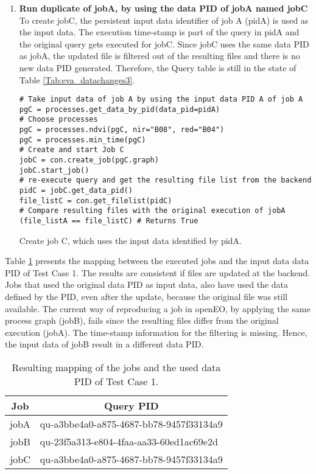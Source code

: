 \documentclass[draft,final]{vutinfth} %
\newenvironment{code}{\captionsetup{type=listing}}{}
\begin{document}
\begin{enumerate}
	\item \textbf{Run duplicate of jobA, by using the data PID of jobA named jobC}\\
	To create jobC, the persistent input data identifier of job A (pidA) is used as the input data. The execution time-stamp is part of the query in pidA and the original query gets executed for jobC. Since jobC uses the same data PID as jobA, the updated file is filtered out of the resulting files and there is no new data PID generated. Therefore, the Query table is still in the state of Table \ref{Tab:eva_datachanges3}. 
	\begin{code}
		\begin{verbatim}
# Take input data of job A by using the input data PID A of job A
pgC = processes.get_data_by_pid(data_pid=pidA)
# Choose processes
pgC = processes.ndvi(pgC, nir="B08", red="B04")
pgC = processes.min_time(pgC)
# Create and start Job C
jobC = con.create_job(pgC.graph)
jobC.start_job()
# re-execute query and get the resulting file list from the backend
pidC = jobC.get_data_pid()
file_listC = con.get_filelist(pidC)
# Compare resulting files with the original execution of jobA
(file_listA == file_listC) # Returns True
		\end{verbatim}
		\caption{Create job C, which uses the input data identified by pidA.}
		\label{lst:eva_datachange_5}
	\end{code}
\end{enumerate}

Table \ref{Tab:eva_datachanges4} presents the mapping between the executed jobs and the input data data PID of Test Case 1. The results are consistent if files are updated at the backend. Jobs that used the original data PID as input data, also have used the data defined by the PID, even after the update, because the original file was still available. The current way of reproducing a job in openEO, by applying the same process graph (jobB), fails since the resulting files differ from the original execution (jobA). The time-stamp information for the filtering is missing. Hence,  the input data of jobB result in a different data PID.     

\begin{table}[]
	\caption{Resulting mapping of the jobs and the used data PID of Test Case 1.}
	\centering
	\begin{tabular}{|r|l|}
		\hline \multicolumn{1}{|c|}{\textbf{Job}}  &  \multicolumn{1}{c|}{\textbf{Query PID}} \\ \hline
		jobA & qu-a3bbe4a0-a875-4687-bb78-9457f33134a9  \\ 
		jobB & qu-23f5a313-e804-4faa-aa33-60ed1ac69e2d \\
		jobC & qu-a3bbe4a0-a875-4687-bb78-9457f33134a9  \\ \hline
	\end{tabular}
	\label{Tab:eva_datachanges4}
\end{table}
\end{document}

